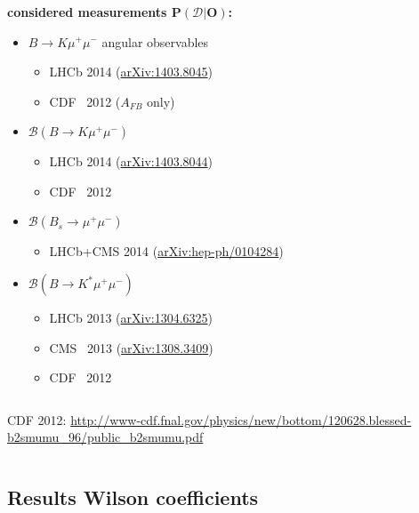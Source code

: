 \documentclass[english]{beamer}
\newcommand{\slide}[2][t]{\begin{frame}[#1] \frametitle{\insertsubsectionhead} #2 \end{frame}}
\begin{document}
\slide[c]{

    {\large\textbf{considered measurements $ \boldsymbol{P\left(\mathcal{D} | \boldsymbol{O} \right)} $:}}

    \begin{itemize}
        \item $B\rightarrow K\mu^+\mu^-$ angular observables
        \begin{itemize}
            \item LHCb 2014 (\href{http://arXiv.org/abs/1403.8045}{arXiv:1403.8045})
            \item CDF~ 2012 ($A_{FB}$ only)
        \end{itemize}
        \item $\mathcal{B}(B\rightarrow{}K\mu^+\mu^-)$
        \begin{itemize}
            \item LHCb 2014 ({\href{http://arXiv.org/abs/1403.8044}{arXiv:1403.8044}})
            \item CDF~ 2012
        \end{itemize}
        \item $\mathcal{B}(B_s\rightarrow\mu^+\mu^-)$
        \begin{itemize}
            \item LHCb+CMS 2014 ({\href{http://arXiv.org/abs/hep-ph/0104284}{arXiv:hep-ph/0104284}})
        \end{itemize}
        \item $\mathcal{B}(B\rightarrow K^\ast\mu^+\mu^-)$
        \begin{itemize}
            \item LHCb 2013 ({\href{http://arXiv.org/abs/1304.6325}{arXiv:1304.6325}})
            \item CMS~ 2013 ({\href{http://arXiv.org/abs/1308.3409}{arXiv:1308.3409}})
            \item CDF~ 2012
        \end{itemize}
    \end{itemize}

    \vspace{3mm}

    \begin{columns}[t]
        \column{.165\textwidth}
            CDF 2012:
        \column{.835\textwidth}
            {\url{http://www-cdf.fnal.gov/physics/new/bottom/120628.blessed-b2smumu_96/public_b2smumu.pdf}}
    \end{columns}
}

\subsection{Results Wilson coefficients}
\end{document}
